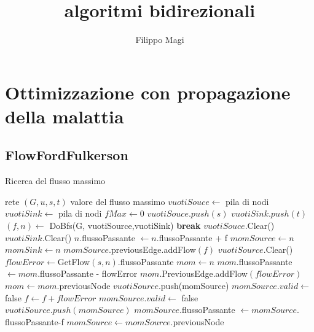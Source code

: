 \documentclass{article}
\title{algoritmi bidirezionali}
\author{Filippo Magi }
\begin{document}
\section{Ottimizzazione con propagazione della malattia}
\subsection{FlowFordFulkerson}


\begin{algorithm}[htp!]

    \caption{Ricerca del flusso massimo}
    \begin{algorithmic}[1]
        \REQUIRE rete $(G,u,s,t)$
        \ENSURE valore del flusso massimo
        \STATE $vuotiSouce \leftarrow  $ pila di nodi
        \STATE $vuotiSink \leftarrow $ pila di nodi
        \STATE $fMax \leftarrow 0$
        \STATE $vuotiSouce.push(s)$
        \STATE $vuotiSink.push(t)$
        \STATE $(f,n) \leftarrow$ DoBfs(G, vuotiSource,vuotiSink)
        \STATE \textbf{break}
        \ENDIF
        \STATE $vuotiSouce.$Clear() 
        \STATE $vuotiSink.$Clear()
        \STATE $n$.flussoPassante $\leftarrow n.$flussoPassante + f
        \STATE $momSource \leftarrow n$
        \STATE $momSink \leftarrow n$
        \STATE $momSource$.previousEdge.addFlow$(f)$ 
        \STATE $vuotiSource.$Clear()
        \STATE $flowError \leftarrow $GetFlow$(s,n).$flussoPassante 
        \STATE $mom \leftarrow n$
        \STATE $mom.$flussoPassante $\leftarrow mom.$flussoPassante - flowError
        \STATE $mom.$PreviousEdge.addFlow$(flowError)$
        \STATE $mom \leftarrow mom.$previousNode
        \ENDWHILE
        \STATE $vuotiSource.$push(momSource)
        \STATE $momSource.valid \leftarrow$ false
        \STATE $f \leftarrow f + flowError$
        \STATE $momSource.valid \leftarrow$ false
        \STATE $vuotiSource.push(momSource)$
        \ENDIF
        \STATE $momSource.$flussoPassante $\leftarrow momSource.$flussoPassante-f
        \STATE $momSource \leftarrow momSource.$previousNode
        \ENDWHILE
    \end{algorithmic}
\end{algorithm}
\end{document}
